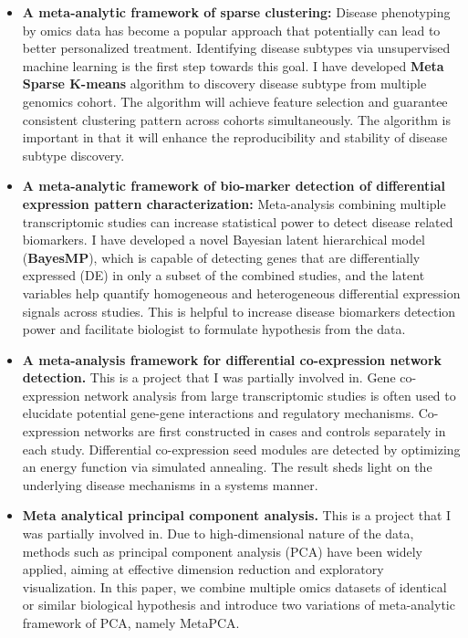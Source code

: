 \documentclass[a4paper, 10pt]{article}
\begin{document}
\begin{itemize}
\item \textbf{A meta-analytic framework of sparse clustering: }
Disease phenotyping by omics data has become a popular approach that potentially can lead to better personalized treatment. 
Identifying disease subtypes via unsupervised machine learning is the first step towards this goal.
I have developed \textbf{Meta Sparse K-means} algorithm\cite{ref:MSKM} to discovery disease subtype from multiple genomics cohort.
The algorithm will achieve feature selection and guarantee consistent clustering pattern across cohorts simultaneously.
The algorithm is important in that it will enhance the reproducibility and stability of disease subtype discovery.

\item \textbf{A meta-analytic framework of bio-marker detection of differential expression pattern characterization: }
Meta-analysis combining multiple transcriptomic studies can increase statistical power to detect disease related biomarkers.
I have developed a novel Bayesian latent hierarchical model (\textbf{BayesMP})\cite{ref:BayesMP},
which is capable of detecting genes that are differentially expressed (DE) in only a subset of the combined studies,
and the latent variables help quantify homogeneous and heterogeneous differential expression signals across studies.
This is helpful to increase disease biomarkers detection power and facilitate biologist to formulate hypothesis from the data.

\item \textbf{A meta-analysis framework for differential co-expression network detection.}
This is a project that I was partially involved in.
Gene co-expression network analysis from large transcriptomic studies is often used to elucidate potential gene-gene interactions and regulatory mechanisms. 
Co-expression networks are first constructed in cases and controls separately in each study. 
Differential co-expression seed modules are detected by optimizing an energy function via simulated annealing.
The result sheds light on the underlying disease mechanisms in a systems manner. 

\item \textbf{Meta analytical principal component analysis.}
This is a project that I was partially involved in.
Due to high-dimensional nature of the data, 
methods such as principal component analysis (PCA) have been widely applied, 
aiming at effective dimension reduction and exploratory visualization.
In this paper, 
we combine multiple omics datasets of identical or similar biological hypothesis and introduce two variations of meta-analytic
framework of PCA, namely MetaPCA.

\end{itemize}
\end{document}
